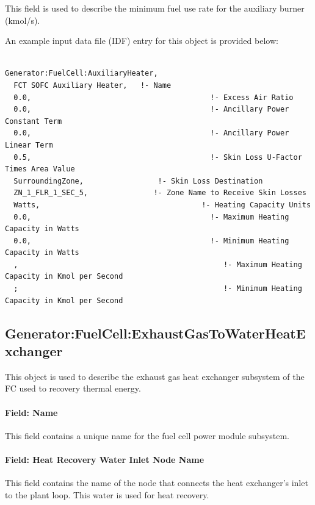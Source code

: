 This field is used to describe the minimum fuel use rate for the auxiliary burner (kmol/s).

An example input data file (IDF) entry for this object is provided below:

\begin{lstlisting}

Generator:FuelCell:AuxiliaryHeater,
  FCT SOFC Auxiliary Heater,   !- Name
  0.0,                                         !- Excess Air Ratio
  0.0,                                         !- Ancillary Power Constant Term
  0.0,                                         !- Ancillary Power Linear Term
  0.5,                                         !- Skin Loss U-Factor Times Area Value
  SurroundingZone,                 !- Skin Loss Destination
  ZN_1_FLR_1_SEC_5,               !- Zone Name to Receive Skin Losses
  Watts,                                     !- Heating Capacity Units
  0.0,                                         !- Maximum Heating Capacity in Watts
  0.0,                                         !- Minimum Heating Capacity in Watts
  ,                                               !- Maximum Heating Capacity in Kmol per Second
  ;                                               !- Minimum Heating Capacity in Kmol per Second
\end{lstlisting}

\subsection{Generator:FuelCell:ExhaustGasToWaterHeatExchanger}\label{generator-fuelcell-exhaustgastowaterheatexchanger}

This object is used to describe the exhaust gas heat exchanger subsystem of the FC used to recovery thermal energy.

\paragraph{Field: Name}\label{field-name-19-000}

This field contains a unique name for the fuel cell power module subsystem.

\paragraph{Field: Heat Recovery Water Inlet Node Name}\label{field-heat-recovery-water-inlet-node-name-2}

This field contains the name of the node that connects the heat exchanger's inlet to the plant loop. This water is used for heat recovery.

